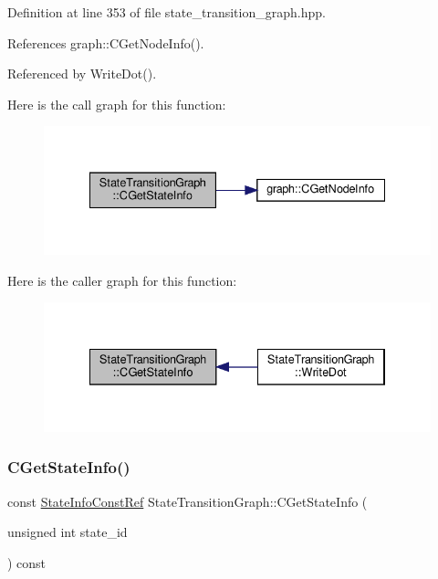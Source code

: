 Definition at line 353 of file state\+\_\+transition\+\_\+graph.\+hpp.



References graph\+::\+C\+Get\+Node\+Info().



Referenced by Write\+Dot().

Here is the call graph for this function\+:
\nopagebreak
\begin{figure}[H]
\begin{center}
\leavevmode
\includegraphics[width=335pt]{d9/d86/structStateTransitionGraph_a74d280e7a12edb40d1fa6a6d9bfd44c3_cgraph}
\end{center}
\end{figure}
Here is the caller graph for this function\+:
\nopagebreak
\begin{figure}[H]
\begin{center}
\leavevmode
\includegraphics[width=334pt]{d9/d86/structStateTransitionGraph_a74d280e7a12edb40d1fa6a6d9bfd44c3_icgraph}
\end{center}
\end{figure}
\mbox{\label{structStateTransitionGraph_a9ab334c1b537406817defc211cd20668}} 
\subsubsection{\texorpdfstring{C\+Get\+State\+Info()}{CGetStateInfo()}\hspace{0.1cm}{\footnotesize\ttfamily [2/2]}}
{\footnotesize\ttfamily const \hyperlink{state__transition__graph_8hpp_a50240fded93adab729e333c2b8090a8b}{State\+Info\+Const\+Ref} State\+Transition\+Graph\+::\+C\+Get\+State\+Info (\begin{DoxyParamCaption}\item[{unsigned int}]{state\+\_\+id }\end{DoxyParamCaption}) const\hspace{0.3cm}{\ttfamily [inline]}}



